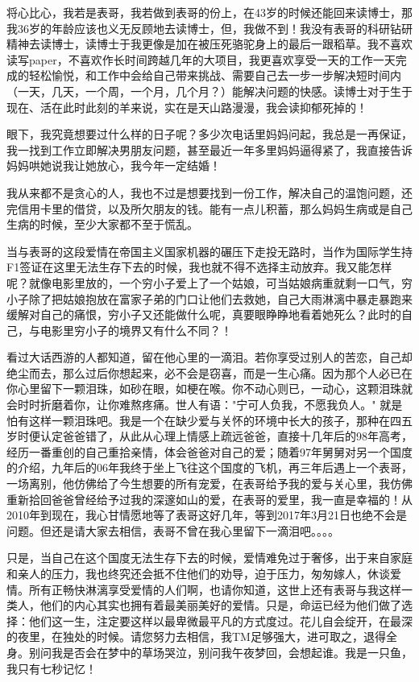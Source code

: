 \documentclass[12pt]{book}
\begin{document}
将心比心，我若是表哥，我若做到表哥的份上，在43岁的时候还能回来读博士，那我36岁的年龄应该也义无反顾地去读博士，但，我做不到！我没有表哥的科研钻研精神去读博士，读博士于我更像是加在被压死骆驼身上的最后一跟稻草。我不喜欢读写paper，不喜欢作长时间跨越几年的大项目，我更喜欢享受一天的工作一天完成的轻松愉悦，和工作中会给自己带来挑战、需要自己去一步一步解决短时间内（一天，几天，一个周，一个月，几个月？）能解决问题的快感。读博士对于生于现在、活在此时此刻的羊来说，实在是天山路漫漫，我会读抑郁死掉的！

眼下，我究竟想要过什么样的日子呢？多少次电话里妈妈问起，我总是一再保证，我一找到工作立即解决男朋友问题，甚至最近一年多里妈妈逼得紧了，我直接告诉妈妈哄她说我让她放心，我今年一定结婚！

我从来都不是贪心的人，我也不过是想要找到一份工作，解决自己的温饱问题，还完信用卡里的借贷，以及所欠朋友的钱。能有一点儿积蓄，那么妈妈生病或是自己生病的时候，至少大家都不至于慌乱。

当与表哥的这段爱情在帝国主义国家机器的碾压下走投无路时，当作为国际学生持F1签证在这里无法生存下去的时候，我也就不得不选择主动放弃。我又能怎样呢？就像电影里放的，一个穷小子爱上了一个姑娘，可当姑娘病重就剩一口气，穷小子除了把姑娘抱放在富家子弟的门口让他们去救她，自己大雨淋漓中暴走暴跑来缓解对自己的痛恨，穷小子又还能做什么呢，真要眼睁睁地看着她死么？此时的自己，与电影里穷小子的境界又有什么不同？！

看过大话西游的人都知道，留在他心里的一滴泪。若你享受过别人的苦恋，自己却绝尘而去，那么过后你想起来，必不会是窃喜，而是一生心痛。因为那个人必已在你心里留下一颗泪珠，如砂在眼，如梗在喉。你不动心则已，一动心，这颗泪珠就会时时折磨着你，让你难熬疼痛。世人有语："宁可人负我，不愿我负人。" 就是怕有这样一颗泪珠吧。我是一个在缺少爱与关怀的环境中长大的孩子，那种在四五岁时便认定爸爸错了，从此从心理上情感上疏远爸爸，直接十几年后的98年高考，经历一番重创的自己重拾亲情，体会爸爸对自己的爱；随着97年舅舅对另一个国度的介绍，九年后的06年我终于坐上飞往这个国度的飞机，再三年后遇上一个表哥，一场离别，他仿佛给了今生想要的所有宠爱，在表哥给予我的爱与关心里，我仿佛重新拾回爸爸曾经给予过我的深邃如山的爱，在表哥的爱里，我一直是幸福的！从2010年到现在，我心甘情愿地等了表哥这好几年，等到2017年3月21日也绝不会是问题。但还是请大家去相信，表哥不曾在我心里留下一滴泪吧。。。。

只是，当自己在这个国度无法生存下去的时候，爱情难免过于奢侈，出于来自家庭和亲人的压力，我也终究还会抵不住他们的劝导，迫于压力，匆匆嫁人，休谈爱情。所有正畅快淋漓享受爱情的人们啊，也请你知道，这世上还有表哥与我这样一类人，他们的内心其实也拥有着最美丽美好的爱情。只是，命运已经为他们做了选择：他们这一生，注定要这样以最卑微最平凡的方式度过。花儿自会绽开，在最深的夜里，在独处的时候。请您努力去相信，我TM足够强大，进可取之，退得全身。别问我是否会在梦中的草场哭泣，别问我午夜梦回，会想起谁。我是一只鱼，我只有七秒记忆！
\end{document}
